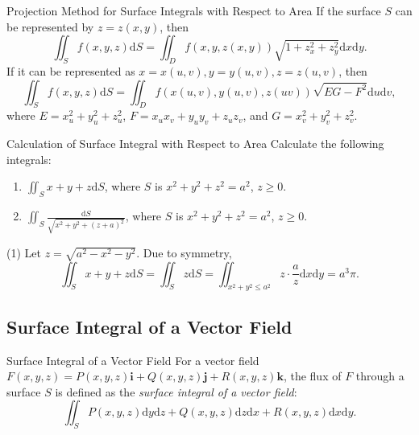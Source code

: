 \begin{proposition}{Projection Method for Surface Integrals with Respect to Area}{}
  If the surface $S$ can be represented by $z = z(x, y)$, then
  \begin{equation}
    \iint_S f(x,y,z)\mathrm{d}S = \iint_D f(x,y,z(x,y)) \sqrt{1 + z_x^2 + z_y^2}\mathrm{d} x \mathrm{d} y.
  \end{equation}
  If it can be represented as $x = x(u, v), y = y(u, v), z = z(u, v)$, then
  \begin{equation}
    \iint_S f(x,y,z)\mathrm{d}S = \iint_D f(x(u,v),y(u,v),z(uv)) \sqrt{EG-F^2}\mathrm{d} u \mathrm{d} v,
  \end{equation}
  where $E = x_u^2 + y_u^2 + z_u^2$, $F = x_ux_v + y_uy_v + z_uz_v$,
  and $G = x_v^2 + y_v^2 + z_v^2$.
\end{proposition}

\begin{example}{Calculation of Surface Integral with Respect to Area}{}
  Calculate the following integrals:
  \begin{enumerate}
  \item $\iint_S x + y + z \mathrm{d} S$, where $S$ is $x^2 + y^2 + z^2 = a^2$,
    $z \geq 0$.
  \item $\iint_S \frac{\mathrm{d} S}{\sqrt{x^2 + y^2 + (z+a)^2}}$, where $S$ is
    $x^2 + y^2 + z^2 = a^2$, $z \geq 0$.
  \end{enumerate}
\end{example}

\begin{solution}
  (1) Let $z = \sqrt{a^2 - x^2 - y^2}$. Due to symmetry, 
  \begin{equation}
    \iint_S x+y+z\mathrm{d}S
    = \iint_S z \mathrm{d} S
    = \iint_{x^2 + y^2 \leq a^2} z \cdot \frac{a}{z} \mathrm{d} x \mathrm{d}y
    = a^3\pi.
  \end{equation}
\end{solution}



\subsection{Surface Integral of a Vector Field}

\begin{definition}{Surface Integral of a Vector Field}{}
  For a vector field $F(x,y,z) = P(x,y,z)\mathbf{i} + Q(x,y,z)\mathbf{j} + R(x,y,z)\mathbf{k}$,
  the flux of $F$ through a surface $S$ is defined as the
  \emph{surface integral of a vector field}:
  \begin{equation}
    \iint_S P(x,y,z)\mathrm{d}y\mathrm{d}z + Q(x,y,z)\mathrm{d}z\mathrm{d}x + R(x,y,z)\mathrm{d} x\mathrm{d}y.
  \end{equation}
\end{definition}

